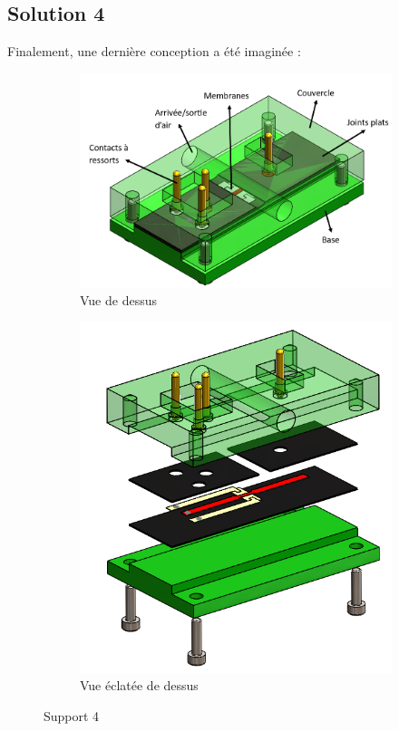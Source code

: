 \newpage
\subsection{Solution 4}
Finalement, une dernière conception a été imaginée :
\begin{figure}[H]
    \centering
    \begin{subfigure}{0.45\textwidth}
        \includegraphics[scale = 0.4]{images/Design5_dessus.png}
        \caption{Vue de dessus}
    \end{subfigure}
    \hspace{1.5cm}
    \begin{subfigure}{0.3\textwidth}
        \includegraphics[scale = 0.45]{assets/figures/designSol4_eclate.png}
        \caption{Vue éclatée de dessus}
    \end{subfigure}
    \caption{Support 4}
    \label{fig:solution4}
\end{figure}

